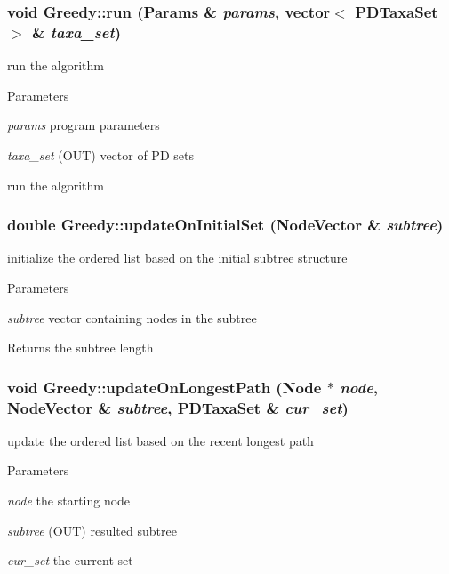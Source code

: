 \hypertarget{classGreedy_a9e5abfe8869f9e6695f77748d6fe5e51}{
\subsubsection[{run}]{\setlength{\rightskip}{0pt plus 5cm}void Greedy::run ({\bf Params} \& {\em params}, \/  vector$<$ {\bf PDTaxaSet} $>$ \& {\em taxa\_\-set})}}
\label{classGreedy_a9e5abfe8869f9e6695f77748d6fe5e51}
run the algorithm 
\begin{DoxyParams}{Parameters}
\item[{\em params}]program parameters \item[{\em taxa\_\-set}](OUT) vector of PD sets\end{DoxyParams}
run the algorithm \hypertarget{classGreedy_a0f31932ace48884fa0b6aadbd444229d}{
\subsubsection[{updateOnInitialSet}]{\setlength{\rightskip}{0pt plus 5cm}double Greedy::updateOnInitialSet (NodeVector \& {\em subtree})}}
\label{classGreedy_a0f31932ace48884fa0b6aadbd444229d}
initialize the ordered list based on the initial subtree structure 
\begin{DoxyParams}{Parameters}
\item[{\em subtree}]vector containing nodes in the subtree \end{DoxyParams}
\begin{DoxyReturn}{Returns}
the subtree length 
\end{DoxyReturn}
\hypertarget{classGreedy_a933a3b9c40efec6d2643092baccf6b7f}{
\subsubsection[{updateOnLongestPath}]{\setlength{\rightskip}{0pt plus 5cm}void Greedy::updateOnLongestPath ({\bf Node} $\ast$ {\em node}, \/  NodeVector \& {\em subtree}, \/  {\bf PDTaxaSet} \& {\em cur\_\-set})}}
\label{classGreedy_a933a3b9c40efec6d2643092baccf6b7f}
update the ordered list based on the recent longest path 
\begin{DoxyParams}{Parameters}
\item[{\em node}]the starting node \item[{\em subtree}](OUT) resulted subtree \item[{\em cur\_\-set}]the current set \end{DoxyParams}


